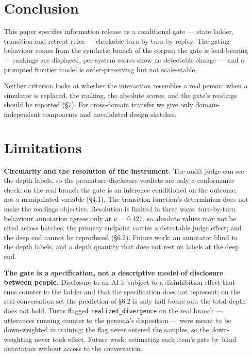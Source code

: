 \documentclass[letterpaper]{article}
\begin{document}
\section{Conclusion}

This paper specifies information release as a conditional gate --- state ladder, transition and retreat rules --- checkable turn by turn by replay. The gating behaviour comes from the synthetic branch of the corpus; the gate is load-bearing --- rankings are displaced, per-system scores show no detectable change --- and a prompted frontier model is order-preserving but not scale-stable.

Neither criterion looks at whether the interaction resembles a real person: when a simulator is replaced, the ranking, the absolute scores, and the gate's readings should be reported (\S{}7). For cross-domain transfer we give only domain-independent components and unvalidated design sketches.\label{p2:lastcontent}


\section*{Limitations}

\textbf{Circularity and the resolution of the instrument.} The audit judge can see the depth labels, so the premature-disclosure verdicts are only a conformance check; on the real branch the gate is an inference conditioned on the outcome, not a manipulated variable (\S{}4.1). The transition function's determinism does not make the readings objective. Resolution is limited in three ways: turn-by-turn behaviour annotation agrees only at $\kappa$ = 0.427, so absolute values may not be cited across batches; the primary endpoint carries a detectable judge effect; and the deep end cannot be reproduced (\S{}6.2). Future work: an annotator blind to the depth labels, and a depth quantity that does not rest on labels at the deep end.

\textbf{The gate is a specification, not a descriptive model of disclosure between people.} Disclosure to an AI is subject to a disinhibition effect that runs counter to the ladder and that the specification does not represent; on the real-conversation set the prediction of \S{}6.2 is only half borne out: the total depth does not hold. Turns flagged \texttt{realized\_divergence} on the real branch --- utterances running counter to the persona's disposition --- were meant to be down-weighted in training; the flag never entered the samples, so the down-weighting never took effect. Future work: estimating each item's gate by blind annotation without access to the conversation.
\end{document}
